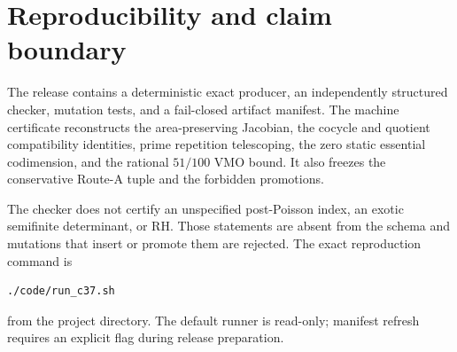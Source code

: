 \section{Reproducibility and claim boundary}\label{app:repro}

The release contains a deterministic exact producer, an independently
structured checker, mutation tests, and a fail-closed artifact manifest.
The machine certificate reconstructs the area-preserving Jacobian, the
cocycle and quotient compatibility identities, prime repetition
telescoping, the zero static essential codimension, and the rational
\(51/100\) VMO bound.  It also freezes the conservative Route-A tuple and
the forbidden promotions.

The checker does not certify an unspecified post-Poisson index, an exotic
semifinite determinant, or RH.  Those statements are absent from the
schema and mutations that insert or promote them are rejected.  The exact
reproduction command is
\begin{verbatim}
./code/run_c37.sh
\end{verbatim}
from the project directory.  The default runner is read-only; manifest
refresh requires an explicit flag during release preparation.
